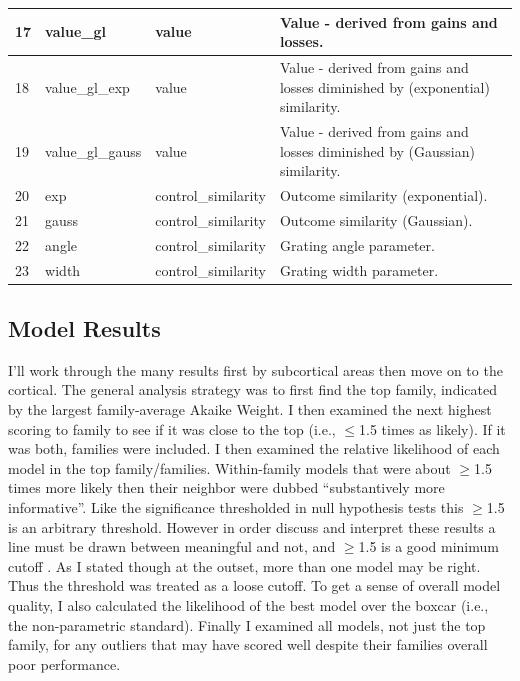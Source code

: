 \documentclass[doc,12pt]{apa}        %
\begin{document}
\begin{center}
\begin{longtable}{ | l | l | l | p{6cm} |}
        17 & value\_gl & value & Value - derived from gains and losses. \\ \hline
        18 & value\_gl\_exp & value & Value - derived from gains and losses diminished by (exponential) similarity. \\ \hline
        19 & value\_gl\_gauss & value & Value - derived from gains and losses diminished by (Gaussian) similarity. \\ \hline 
        20 & exp & control\_similarity & Outcome similarity (exponential). \\ \hline
        21 & gauss & control\_similarity & Outcome similarity (Gaussian). \\ \hline
        22 & angle & control\_similarity & Grating angle parameter. \\ \hline
        23 &width & control\_similarity & Grating width parameter. \\ \hline
    \end{longtable}
\end{center}


\subsection{Model Results}
\label{sub:modelresults}
I'll work through the many results first by subcortical areas then move on to the cortical.  The general analysis strategy was to first find the top family, indicated by the largest family-average Akaike Weight.  I then examined the next highest scoring to family to see if it was close to the top (i.e., $\le$1.5 times as likely).  If it was both, families were included.  I then examined the relative likelihood of each model in the top family/families.  Within-family models that were about $\ge$1.5 times more likely then their neighbor were dubbed ``substantively more informative''.  Like the significance thresholded in null hypothesis tests this $\ge$1.5 is an arbitrary threshold.  However in order discuss and interpret these results a line must be drawn between meaningful and not, and $\ge$1.5 is a good minimum cutoff \cite{Anderson:2000p9475, Forster:2000p9623}.  As I stated though at the outset, more than one model may be right.  Thus the threshold was treated as a loose cutoff.  To get a sense of overall model quality, I also calculated the likelihood of the best model over the boxcar (i.e., the non-parametric standard).  Finally I examined all models, not just the top family, for any outliers that may have scored well despite their families overall poor performance.
\end{document}
